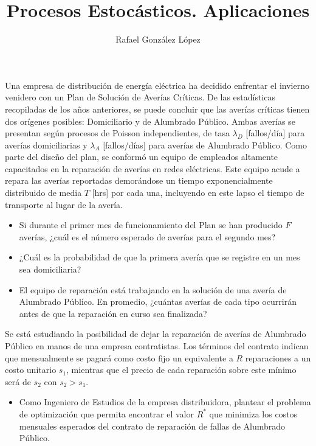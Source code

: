 \documentclass[twoside]{article}
\begin{document}
\title{Procesos Estocásticos. Aplicaciones}
\author{Rafael González López}
\maketitle
\begin{ejercicio}{2}
Una empresa de distribución de energía eléctrica ha decidido enfrentar el invierno venidero con un Plan de Solución de Averías Críticas. De las estadísticas recopiladas de los años anteriores, se puede concluir que las averías críticas tienen dos orígenes posibles: Domiciliario y de Alumbrado Público. Ambas averías se presentan según procesos de Poisson independientes, de tasa $\lambda_D$ [fallos/día] para averías domiciliarias y $\lambda_A$ [fallos/días] para averías de Alumbrado Público. Como parte del diseño del plan, se conformó un equipo de empleados altamente capacitados en la reparación de averías en redes eléctricas. Este equipo acude a repara las averías reportadas demorándose un tiempo exponencialmente distribuido de media $T$ [hrs] por cada una, incluyendo en este lapso el tiempo de transporte al lugar de la avería.
\begin{itemize}
\item Si durante el primer mes de funcionamiento del Plan se han producido $F$ averías, ¿cuál es el número esperado de averías para el segundo mes?
\item ¿Cuál es la probabilidad de que la primera avería que se registre en un mes sea domiciliaria?
\item El equipo de reparación está trabajando en la solución de una avería de Alumbrado Público. En promedio, ¿cuántas averías de cada tipo ocurrirán antes de que la reparación en curso sea finalizada?
\end{itemize}
Se está estudiando la posibilidad de dejar la reparación de averías de Alumbrado Público en manos de una empresa contratistas. Los términos del contrato indican que mensualmente se pagará como costo fijo un equivalente a $R$ reparaciones a un costo unitario $s_1$, mientras que el precio de cada reparación sobre este mínimo será de $s_2$ con $s_2>s_1$.
\begin{itemize}

\item Como Ingeniero de Estudios de la empresa distribuidora, plantear el problema de optimización que permita encontrar el valor $R^*$ que minimiza los costos mensuales esperados del contrato de reparación de fallas de Alumbrado Público.
\end{itemize}
\end{ejercicio}
\end{document}

